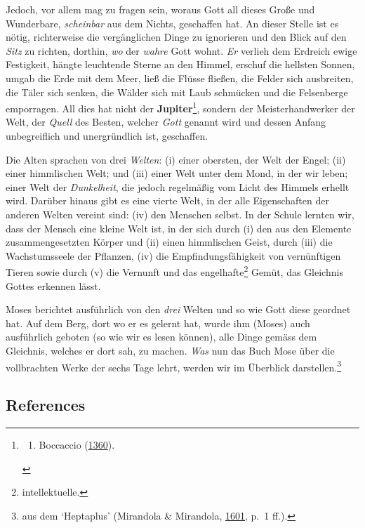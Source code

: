 \documentclass[
]{article}
\providecommand{\tightlist}{%
  \setlength{\itemsep}{0pt}\setlength{\parskip}{0pt}}
\begin{document}
Jedoch, vor allem mag zu fragen sein, woraus Gott all dieses Große und
Wunderbare, \emph{scheinbar} aus dem Nichts, geschaffen hat. An dieser
Stelle ist es nötig, richterweise die vergänglichen Dinge zu ignorieren
und den Blick auf den \emph{Sitz} zu richten, dorthin, \emph{wo} der
\emph{wahre} Gott wohnt. \emph{Er} verlieh dem Erdreich ewige
Festigkeit, hängte leuchtende Sterne an den Himmel, erschuf die hellsten
Sonnen, umgab die Erde mit dem Meer, ließ die Flüsse fließen, die Felder
sich ausbreiten, die Täler sich senken, die Wälder sich mit Laub
schmücken und die Felsenberge emporragen. All dies hat nicht der
\textbf{Jupiter}\footnote{\begin{enumerate}
  \def\labelenumi{\alph{enumi}.}
  \setcounter{enumi}{18}
  \tightlist
  \item
    Boccaccio
    (\href{https://digi.vatlib.it/view/MSS_Pal.lat.938}{1360}).
  \end{enumerate}}, sondern der Meisterhandwerker der Welt, der
\emph{Quell} des Besten, welcher \emph{Gott} genannt wird und dessen
Anfang unbegreiflich und unergründlich ist, geschaffen.

Die Alten sprachen von drei \emph{Welten}: (i) einer obersten, der Welt
der Engel; (ii) einer himmlischen Welt; und (iii) einer Welt unter dem
Mond, in der wir leben; einer Welt der \emph{Dunkelheit}, die jedoch
regelmäßig vom Licht des Himmels erhellt wird. Darüber hinaus gibt es
eine vierte Welt, in der alle Eigenschaften der anderen Welten vereint
sind: (iv) den Menschen selbst. In der Schule lernten wir, dass der
Mensch eine kleine Welt ist, in der sich durch (i) den aus den Elemente
zusammengesetzten Körper und (ii) einen himmlischen Geist, durch (iii)
die Wachstumsseele der Pflanzen, (iv) die Empfindungsfähigkeit von
vernünftigen Tieren sowie durch (v) die Vernunft und das
engelhafte\footnote{intellektuelle.} Gemüt, das Gleichnis Gottes
erkennen lässt.

Moses berichtet ausführlich von den \emph{drei} Welten und so wie Gott
diese geordnet hat. Auf dem Berg, dort wo er es gelernt hat, wurde ihm
(Moses) auch ausführlich geboten (so wie wir es lesen können), alle
Dinge gemäss dem Gleichnis, welches er dort sah, zu machen. \emph{Was}
nun das Buch Mose über die vollbrachten Werke der sechs Tage lehrt,
werden wir im Überblick darstellen.\footnote{aus dem `Heptaplus'
  (Mirandola \& Mirandola,
  \href{https://doi.org/10.3931/e-rara-61217}{1601}, p.~1 ff.).}

\hypertarget{references}{%
\subsection{References}\label{references}}
\end{document}
